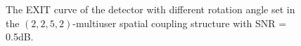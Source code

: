 \documentclass[conference]{IEEEtran}
\begin{document}
\begin{figure}[h!]
\setlength{\abovecaptionskip}{0.cm}
\setlength{\belowcaptionskip}{-0.cm}
  \caption{The EXIT curve of the detector with different rotation angle set in the $\left( {2,2,5,2} \right)$-multiuser spatial coupling structure with SNR = 0.5dB.}\label{fig.6}
    \vspace{-1em}
\end{figure}
\end{document}
